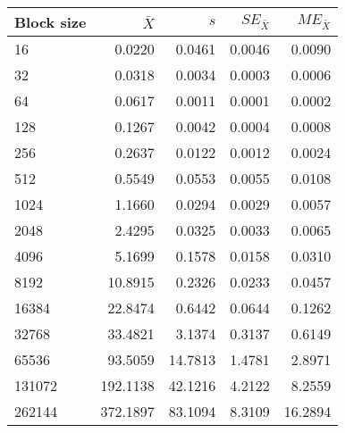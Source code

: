 \begin{tabular}{lrrrr}\toprule
{\small Block size} & $\bar{X}$ & $s$ & $SE_{\bar{X}}$ & $ME_{\bar{X}}$ \\\midrule
16 & 0.0220 & 0.0461 & 0.0046 & 0.0090\\
32 & 0.0318 & 0.0034 & 0.0003 & 0.0006\\
64 & 0.0617 & 0.0011 & 0.0001 & 0.0002\\
128 & 0.1267 & 0.0042 & 0.0004 & 0.0008\\
256 & 0.2637 & 0.0122 & 0.0012 & 0.0024\\
512 & 0.5549 & 0.0553 & 0.0055 & 0.0108\\
1024 & 1.1660 & 0.0294 & 0.0029 & 0.0057\\
2048 & 2.4295 & 0.0325 & 0.0033 & 0.0065\\
4096 & 5.1699 & 0.1578 & 0.0158 & 0.0310\\
8192 & 10.8915 & 0.2326 & 0.0233 & 0.0457\\
16384 & 22.8474 & 0.6442 & 0.0644 & 0.1262\\
32768 & 33.4821 & 3.1374 & 0.3137 & 0.6149\\
65536 & 93.5059 & 14.7813 & 1.4781 & 2.8971\\
131072 & 192.1138 & 42.1216 & 4.2122 & 8.2559\\
262144 & 372.1897 & 83.1094 & 8.3109 & 16.2894\\
\bottomrule
\end{tabular}
